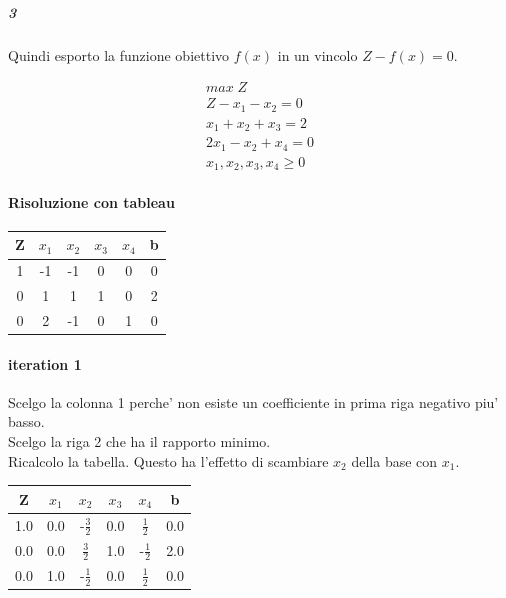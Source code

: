 \documentclass[a4paper,12pt,oneside]{article}
\begin{document}
    \subparagraph{3}

    Quindi esporto la funzione obiettivo $f(x)$ in un vincolo $Z - f(x) = 0$.

    \begin{align}
        \text{$max \; Z$} \\
        \text{$Z - x_1 - x_2 = 0$} \\
        \text{$x_1 + x_2 + x_3 = 2$} \\
        \text{$2 x_1 - x_2 + x_4 = 0$} \\
        \text{$x_1, x_2, x_3, x_4 \geq 0$}
     \end{align}

    \paragraph{Risoluzione con tableau}
   
    \begin{center}
        \begin{tabular}{|c|c|c|c|c|c|}
            \hline
            Z & $x_1$ & $x_2$ & $x_3$ & $x_4$ & b\\
            \hline
            1 & -1 & -1 & 0 & 0 & 0\\
            0 & 1 & 1 & 1 & 0 & 2\\
            0 & 2 & -1 & 0 & 1 & 0\\
            \hline
        \end{tabular}
    \end{center}
    \paragraph{iteration 1}
    Scelgo la colonna 1 perche' non esiste un coefficiente in prima riga negativo piu' basso. \\
    Scelgo la riga 2 che ha il rapporto minimo. \\
    Ricalcolo la tabella.
    Questo ha l'effetto di scambiare $x_2$ della base con $x_1$. \
    \begin{center}
        \begin{tabular}{|c|c|c|c|c|c|}
            \hline
            Z & $x_1$ & $x_2$ & $x_3$ & $x_4$ & b\\
            \hline
            1.0 & 0.0 & -$\frac 3 2$ & 0.0 & $\frac 1 2$ & 0.0\\
            0.0 & 0.0 & $\frac 3 2$ & 1.0 & -$\frac 1 2$ & 2.0\\
            0.0 & 1.0 & -$\frac 1 2$ & 0.0 & $\frac 1 2$ & 0.0\\
            \hline
        \end{tabular}
    \end{center}
\end{document}
